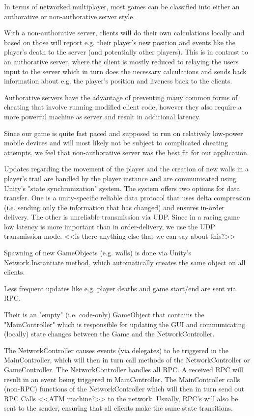 \documentclass{report}
\begin{document}
In terms of networked multiplayer, most games can be classified into either an authorative or non-authorative server style.

With a non-authorative server, clients will do their own calculations locally and based on those will report e.g. their player's new position and events like the player's death to the server (and potentially other players). This is in contrast to an authorative server, where the client is mostly reduced to relaying the users input to the server which in turn does the necessary calculations and sends back information about   e.g. the player's position and liveness back to the clients.

Authorative servers have the advantage of preventing many common forms of cheating that involve running modified client code, however they also require a more powerful machine as server and result in additional latency.

Since our game is quite fast paced and supposed to run on relatively low-power mobile devices and will most likely not be subject to complicated cheating attempts, we feel that non-authorative server was the best fit for our application.


Updates regarding the movement of the player and the creation of new walls in a player's trail are handled by the player instance and are communicated using Unity's "state synchronization" system. 
The system offers two options for data transfer. One is a unity-specific reliable data protocol that uses delta compression (i.e. sending only the information that has changed) and ensures in-order delivery. The other is unreliable transmission via UDP.
Since in a racing game low latency is more important than in order-delivery, we use the UDP transmission mode.
<<is there anything else that we can say about this?>>

Spawning of new GameObjects (e.g. walls) is done via Unity's Network.Instantiate method, which automatically creates the same object on all clients.

Less frequent updates like e.g. player deaths and game start/end are sent via RPC.

Their is an "empty" (i.e. code-only) GameObject that contains the "MainController" which is responsible for updating the GUI and communicating (locally) state changes between the Game and the NetworkController.

The NetworkController causes events (via delegates) to be triggered in the MainController, which will then in turn call methods of the NetworkController or GameController.
The NetworkController handles all RPC. A received RPC will result in an event being triggered in MainController.
The MainController calls (non-RPC) functions of the NetworkController which will then in turn send out RPC Calls <<ATM machine?>> to the network.
Usually, RPC's will also be sent to the sender, ensuring that all clients make the same state transitions.
\end{document}
